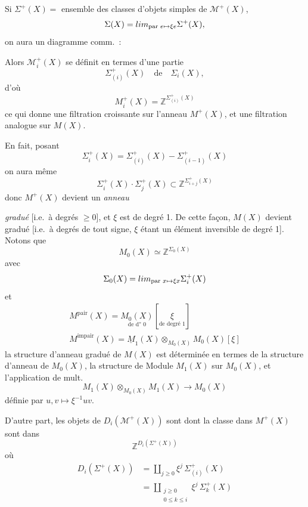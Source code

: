 \documentclass[11pt,a4paper]{article}
\begin{document}
Si $\Sigma^{+}(X) =$ ensemble des classes d'objets simples de
$\mathcal{M}^{+}(X)$,
\[
  \Sigma(X) = \varinjlim_{\text{par } e \mapsto \xi e} \Sigma^{+}(X) ,
\]
on aura  un diagramme comm.\ :


Alors $\mathcal{M}^{+}_{i}(X)$ se définit en termes d'une partie
\[
  \Sigma^{+}_{(i)}(X) \quad \text{de} \quad \Sigma_{i}(X),
\]
d'où
\[
  M^{+}_{i}(X) = \mathbb{Z}^{\Sigma^{+}_{(i)}(X)}
\]
ce qui donne une filtration croissante sur l'anneau $M^{+}(X)$, et une
filtration analogue sur $M(X)$.

En fait, posant
\[
  \Sigma^{+}_{i}(X) = \Sigma^{+}_{(i)}(X) - \Sigma^{+}_{(i-1)}(X)
\]
on aura même
\[
  \Sigma^{+}_{i}(X) \cdot \Sigma^{+}_{j}(X) \subset \mathbb{Z}^{\Sigma^{+}_{i+j}(X)}
\]
donc $M^{+}(X)$ devient un \emph{anneau}

\emph{gradué} [i.e.\ à degrés $\geqslant 0$], et $\xi$ est de degré 1. De cette
façon, $M(X)$ devient gradué [i.e.\ à degrés de tout signe, $\xi$ étant un
élément inversible de degré 1]. Notons que
\[
  M_{0}(X) \simeq \mathbb{Z}^{\Sigma_{0}(X)}
\]
avec
\[
  \Sigma_{0}(X) = \varinjlim_{\text{par } x \mapsto \xi x} \Sigma^{+}_{i}(X)
\]
et
\[
  \begin{array}{l}
    M^{\text{pair}}(X) = \underset{\text{de d° 0}}{M_{0}(X)}[\underset{\text{de degré } 1}{\xi}] \\
    M^{\text{impair}}(X) = \underline{M}_{1}(X) \otimes_{M_{0}(X)} M_{0}(X)[\xi]
  \end{array}
\]
 la structure d'anneau gradué de $M(X)$ est déterminée en
termes de la structure d'anneau de $M_{0}(X)$,  la structure de
Module $M_{1}(X)$ sur $M_{0}(X)$, et l'application de mult.
\[
  M_{1}(X) \otimes_{M_{0}(X)} M_{1}(X) \to M_{0}(X)
\]
définie par $u, v \mapsto \xi^{-1}uv$.

D'autre part, les objets de $D_{i}(\mathcal{M}^{+}(X))$ sont
\struck{\ill{}}  dont la classe dans  $M^{+}(X)$ sont dans
\[
  \mathbb{Z}^{D_{i}(\Sigma^{+}(X))}
\]
où
\[
  \begin{aligned}
    D_{i}(\Sigma^{+}(X)) &= \coprod_{j \geqslant 0} \xi^{j}\, \Sigma^{+}_{(i)}(X) \\
    &= \coprod_{\substack{j \geqslant 0 \\ 0 \leqslant k \leqslant i}} \xi^{j}\, \Sigma^{+}_{k}(X)
  \end{aligned}
\]
\end{document}
